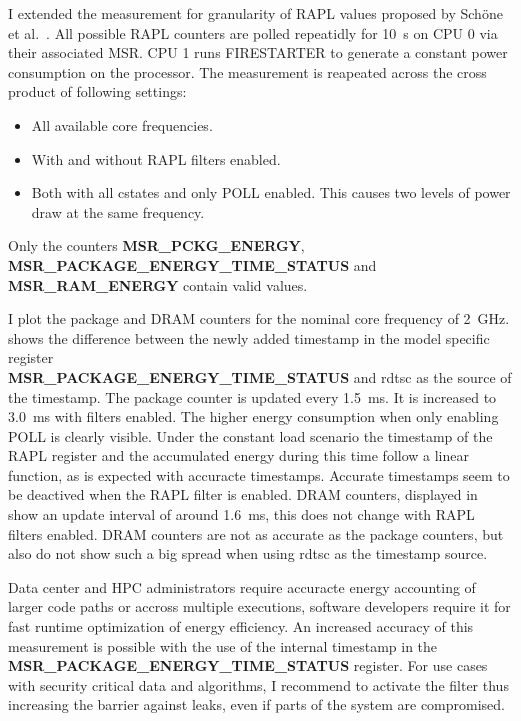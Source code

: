 I extended the measurement for granularity of RAPL values proposed by Schöne et al.~\cite{Schoene_2024_Alder_Lake}.
All possible RAPL counters are polled repeatidly for \SI{10}{\s} on CPU 0 via their associated MSR.
CPU 1 runs FIRESTARTER to generate a constant power consumption on the processor.
The measurement is reapeated across the cross product of following settings:
\begin{itemize}
    \item All available core frequencies.
    \item With and without RAPL filters enabled.
    \item Both with all cstates and only POLL enabled.
    This causes two levels of power draw at the same frequency.
\end{itemize}
Only the counters \textbf{MSR\_PCKG\_ENERGY}, \textbf{MSR\_PACKAGE\_ENERGY\_TIME\_STATUS} and\\ \textbf{MSR\_RAM\_ENERGY} contain valid values.

I plot the package and DRAM counters for the nominal core frequency of \SI{2}{\GHz}.
 shows the difference between the newly added timestamp in the model specific register\\ \textbf{MSR\_PACKAGE\_ENERGY\_TIME\_STATUS} and rdtsc as the source of the timestamp.
The package counter is updated every \SI{1.5}{\ms}.
It is increased to \SI{3.0}{\ms} with filters enabled.
The higher energy consumption when only enabling POLL is clearly visible.
Under the constant load scenario the timestamp of the RAPL register and the accumulated energy during this time follow a linear function, as is expected with accuracte timestamps.
Accurate timestamps seem to be deactived when the RAPL filter is enabled.
DRAM counters, displayed in  show an update interval of around \SI{1.6}{\ms}, this does not change with RAPL filters enabled.
DRAM counters are not as accurate as the package counters, but also do not show such a big spread when using rdtsc as the timestamp source.

Data center and HPC administrators require accuracte energy accounting of larger code paths or accross multiple executions, software developers require it for fast runtime optimization of energy efficiency.
An increased accuracy of this measurement is possible with the use of the internal timestamp in the \textbf{MSR\_PACKAGE\_ENERGY\_TIME\_STATUS} register.
For use cases with security critical data and algorithms, I recommend to activate the filter thus increasing the barrier against leaks, even if parts of the system are compromised.

